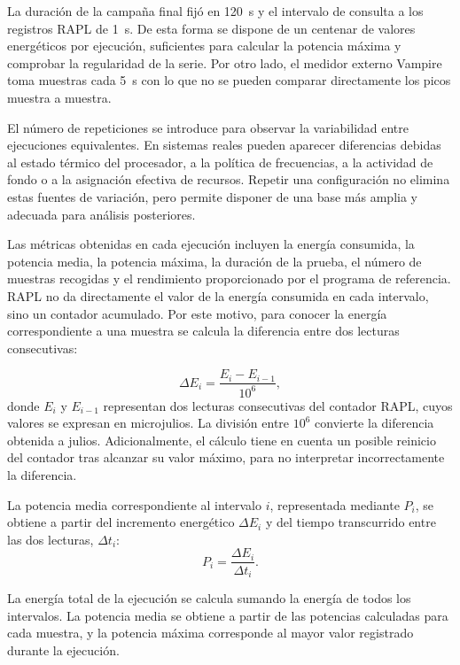 La duración de la campaña final fijó en 120~s y el intervalo de consulta a los registros RAPL de 1~s. De esta forma se dispone de un centenar de valores energéticos por ejecución, suficientes para calcular la potencia máxima y comprobar la regularidad de la serie. Por otro lado, el medidor externo Vampire toma muestras cada 5~s con lo que no se pueden comparar directamente los picos muestra a muestra.

El número de repeticiones se introduce para observar la variabilidad entre ejecuciones equivalentes. En sistemas reales pueden aparecer diferencias debidas al estado térmico del procesador, a la política de frecuencias, a la actividad de fondo o a la asignación efectiva de recursos. Repetir una configuración no elimina estas fuentes de variación, pero permite disponer de una base más amplia y adecuada para análisis posteriores.

Las métricas obtenidas en cada ejecución incluyen la energía consumida, la potencia media, la potencia máxima, la duración de la prueba, el número de muestras recogidas y el rendimiento proporcionado por el programa de referencia. RAPL no da directamente el valor de la energía consumida en cada intervalo, sino un contador acumulado. Por este motivo, para conocer la energía correspondiente a una muestra se calcula la diferencia entre dos lecturas consecutivas:

\begin{equation}
\Delta E_i = \frac{E_i-E_{i-1}}{10^6},
\label{eq:incremento-energia-rapl}
\end{equation}
donde \(E_i\) y \(E_{i-1}\) representan dos lecturas consecutivas del contador RAPL, cuyos valores se expresan en microjulios. La división entre \(10^6\) convierte la diferencia obtenida a julios. Adicionalmente, el cálculo tiene en cuenta un posible reinicio del contador tras alcanzar su valor máximo, para no interpretar incorrectamente la diferencia.

La potencia media correspondiente al intervalo \(i\), representada mediante \(P_i\), se obtiene a partir del incremento energético \(\Delta E_i\) y del tiempo transcurrido entre las dos lecturas, \(\Delta t_i\):
\begin{equation}
P_i = \frac{\Delta E_i}{\Delta t_i}.
\label{eq:potencia-intervalo-rapl}
\end{equation}

La energía total de la ejecución se calcula sumando la energía de todos los intervalos. La potencia media se obtiene a partir de las potencias calculadas para cada muestra, y la potencia máxima corresponde al mayor valor registrado durante la ejecución.

